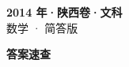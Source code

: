 \documentclass[zihao=-4, a4paper]{ctexart}
\begin{document}
\begin{center}
  {\Large\bfseries 2014 年·陕西卷·文科}\\[4pt]
  {\large 数学 · 简答版}
\end{center}
\medskip
{}

\clearpage
{}
\begin{center}{\Large\bfseries 答案速查}\end{center}
\medskip

\end{document}
